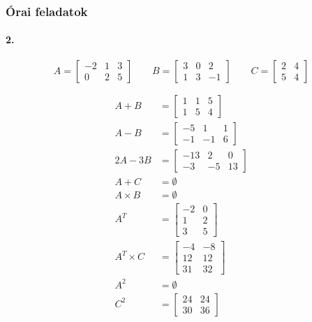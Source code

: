 \documentclass[12pt,a4paper,fleqn]{article}
\newcommand{\myparagraph}[1]{\paragraph{#1}\mbox{}}
\begin{document}
\subsubsection{Órai feladatok}

\myparagraph{2.}
\[
  A = \begin{bmatrix} -2 & 1 & 3 \\ 0 & 2 & 5 \end{bmatrix} \qquad
  B = \begin{bmatrix} 3 & 0 & 2 \\ 1 & 3 & -1 \end{bmatrix} \qquad
  C = \begin{bmatrix} 2 & 4 \\ 5 & 4 \end{bmatrix}
\]

\begin{align*}
  A + B &=
  \begin{bmatrix}
    1 & 1 & 5 \\
    1 & 5 & 4
  \end{bmatrix} \\
  A - B &=
  \begin{bmatrix}
    -5 & 1 & 1 \\
    -1 & -1 & 6
  \end{bmatrix} \\
  2A - 3B &=
  \begin{bmatrix}
    -13 & 2  & 0 \\
    -3  & -5 & 13
  \end{bmatrix} \\
  A + C &= \emptyset \\
  A \times B &= \emptyset \\
  A^{T} &=
  \begin{bmatrix}
    -2 & 0 \\
    1 & 2 \\
    3 & 5
  \end{bmatrix} \\
  A^T \times C &=
  \begin{bmatrix}
    -4 & -8 \\
    12 & 12 \\
    31 & 32
  \end{bmatrix} \\
  A^2 &= \emptyset \\
  C^2 &=
  \begin{bmatrix}
    24 & 24 \\
    30 & 36
  \end{bmatrix} \\
\end{align*}
\end{document}
